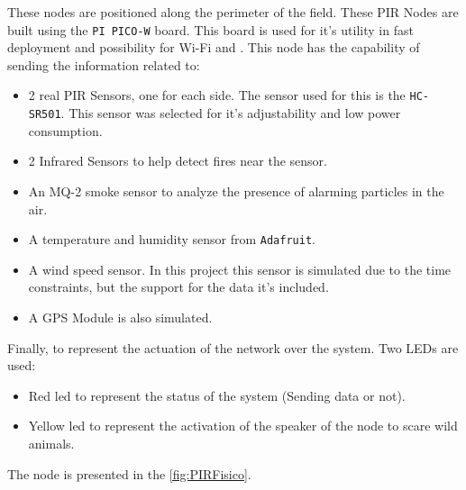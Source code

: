 These nodes are positioned along the perimeter of the field. These PIR Nodes are built using the \texttt{PI PICO-W} board\cite{picowdatasheet}. This board is used 
for it's utility in fast deployment and possibility for Wi-Fi and . This node has the capability of sending the information related to:
\begin{itemize}
    \item 2 real PIR Sensors, one for each side. The sensor used for this is the \texttt{HC-SR501}\cite{MANUALDELUSUARIOSENSORDEMOVIMIENTOPIRHCSR501}. This sensor was selected for it's adjustability and low power consumption.
    \item 2 Infrared Sensors to help detect fires near the sensor.
    \item An MQ-2 smoke sensor\cite{mq2} to analyze the presence of alarming particles in the air.
    \item A temperature and humidity sensor from \texttt{Adafruit}\cite{DHT11basictemperaturehumidity}.
    \item A wind speed sensor. In this project this sensor is simulated due to the time constraints, but the support for the data it's included.
    \item A GPS Module is also simulated.
\end{itemize}

Finally, to represent the actuation of the network over the system. Two LEDs are used:
\begin{itemize}
    \item Red led to represent the status of the system (Sending data or not).
    \item Yellow led to represent the activation of the speaker of the node to scare wild animals.
\end{itemize}

The node is presented in the \autoref{fig:PIRFisico}.

